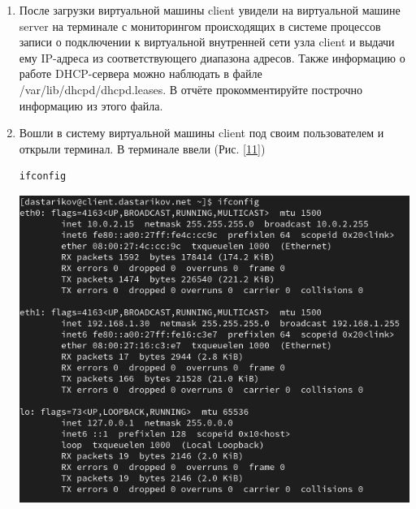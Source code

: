 \begin{enumerate}
\item После загрузки виртуальной машины client увидели на виртуальной машине server на терминале с мониторингом происходящих в системе процессов записи о подключении к виртуальной внутренней сети узла client и выдачи ему IP-адреса из соответствующего диапазона адресов. Также информацию о работе DHCP-сервера можно наблюдать в файле /var/lib/dhcpd/dhcpd.leases. В отчёте прокомментируйте построчно информацию из этого файла.
\item Вошли в систему виртуальной машины client под своим пользователем и открыли терминал. В терминале ввели  (Рис. \ref{11})
    \begin{verbatim}
ifconfig
    \end{verbatim}

\begin{center}
    \centering
    \includegraphics[width=\textwidth]{../images/image11.png}
    \label{11}
\end{center}

\end{enumerate}

